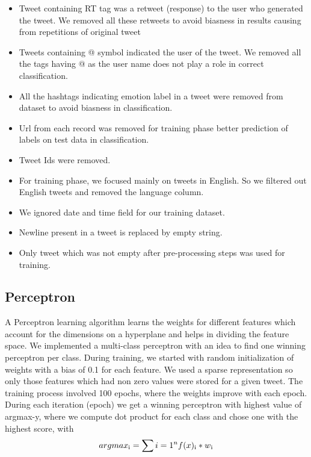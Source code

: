 \documentclass[11pt]{article}
\begin{document}
  \begin{itemize}
  \item Tweet containing RT tag was a retweet (response) to the user who generated the tweet. We removed all these retweets to avoid biasness in results causing from repetitions of original tweet
  \item Tweets containing @ symbol indicated the user of the tweet. We removed all the tags having @ as the user name does not play a role in correct classification.
  \item All the hashtags indicating emotion label in a tweet were removed from dataset to avoid biasness in classification.
  \item Url from each record was removed for training phase better prediction of labels on test data in classification.
  \item Tweet Ids were removed.
  \item For training phase, we focused mainly on tweets in English. So we filtered out English tweets and removed the language column.
  \item We ignored date and time field for our training dataset.
  \item   Newline present in a tweet is replaced by empty string.
  \item   Only tweet which was not empty after pre-processing steps was used for training.
  \end{itemize}
  
  
  \subsection{Perceptron}
  
  A Perceptron learning algorithm learns the weights for different features which account for the dimensions on a hyperplane and helps in dividing the feature space. We implemented a multi-class perceptron with an idea to find one winning perceptron per class.
    During training, we started with random initialization of weights with a bias of 0.1 for each feature. We used a sparse representation so only those features which had non zero values were stored for a given tweet. The training process involved 100 epochs, where the weights improve with each epoch. During each iteration (epoch) we get a winning perceptron with highest value of argmax-y, where we compute dot product for each class and chose one with the highest score, with
    {$$arg max\textsubscript{i} = \sum\limits {i=1}^n f(x)\textsubscript{i} * w\textsubscript{i}$$}
  
\end{document}
